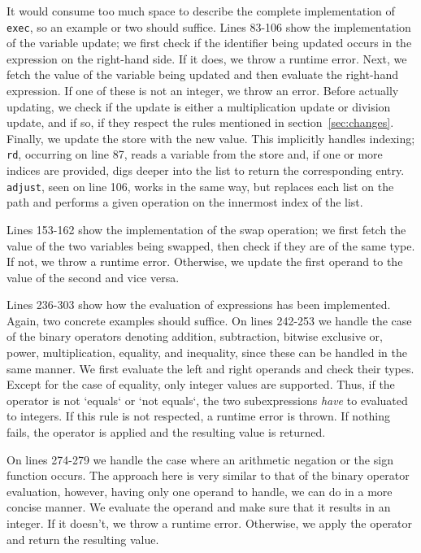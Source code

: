 It would consume too much space to describe the complete implementation of \texttt{exec}, so an example or two should suffice. Lines 83-106 show the implementation of the variable update; we first check if the identifier being updated occurs in the expression on the right-hand side. If it does, we throw a runtime error. Next, we fetch the value of the variable being updated and then evaluate the right-hand expression. If one of these is not an integer, we throw an error. Before actually updating, we check if the update is either a multiplication update or division update, and if so, if they respect the rules mentioned in section~\ref{sec:changes}. Finally, we update the store with the new value. This implicitly handles indexing; \texttt{rd}, occurring on line 87, reads a variable from the store and, if one or more indices are provided, digs deeper into the list to return the corresponding entry. \texttt{adjust}, seen on line 106, works in the same way, but replaces each list on the path and performs a given operation on the innermost index of the list.

Lines 153-162 show the implementation of the swap operation; we first fetch the value of the two variables being swapped, then check if they are of the same type. If not, we throw a runtime error. Otherwise, we update the first operand to the value of the second and vice versa.

Lines 236-303 show how the evaluation of expressions has been implemented. Again, two concrete examples should suffice. On lines 242-253 we handle the case of the binary operators denoting addition, subtraction, bitwise exclusive or, power, multiplication, equality, and inequality, since these can be handled in the same manner. We first evaluate the left and right operands and check their types. Except for the case of equality, only integer values are supported. Thus, if the operator is not `equals` or `not equals`, the two subexpressions \textit{have} to evaluated to integers. If this rule is not respected, a runtime error is thrown. If nothing fails, the operator is applied and the resulting value is returned.

On lines 274-279 we handle the case where an arithmetic negation or the sign function occurs. The approach here is very similar to that of the binary operator evaluation, however, having only one operand to handle, we can do in a more concise manner. We evaluate the operand and make sure that it results in an integer. If it doesn't, we throw a runtime error. Otherwise, we apply the operator and return the resulting value.

